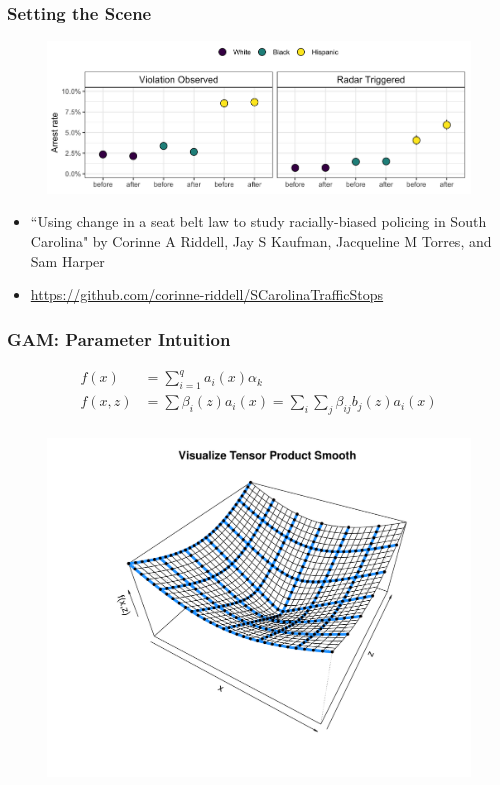 \documentclass{beamer}
\begin{document}
\begin{frame}
\frametitle{Setting the Scene}


\begin{figure}
\includegraphics[scale=.5]{figures/arrestRates}
\end{figure}


\begin{itemize}

\item ``Using change in a seat belt law to study racially-biased policing in South Carolina" by Corinne A Riddell, Jay S Kaufman, Jacqueline M Torres, and Sam Harper

\item \url{https://github.com/corinne-riddell/SCarolinaTrafficStops}

\end{itemize}

\end{frame}


\begin{frame}
\frametitle{GAM: Parameter Intuition}

\small{
\begin{align*}
 f(x)&=\sum \limits_{i=1}^q a_i(x) \alpha_k\\
f(x,z)&= \sum \beta_i(z) a_i(x) = \sum_i \sum_j \beta_{ij} b_j(z) a_i(x) \\
\end{align*}}
\vspace{-.3in}
\begin{figure}
\includegraphics[scale=.25]{figures/tensorProductViz}

\end{figure}

\end{frame}
\end{document}
